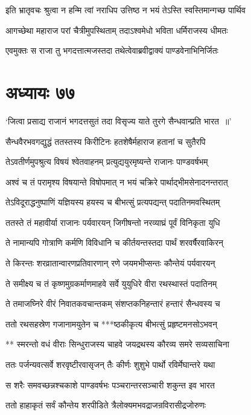 \twolineshloka
{इति भ्रातृवचः श्रुत्वा न हन्मि त्वां नराधिप}
{उत्तिष्ठ न भयं तेऽस्ति स्वस्तिमान्गच्छ पार्थिव}


\twolineshloka
{आगच्छेथा महाराज परां चैत्रीमुपस्थिताम्}
{तदाऽश्वमेधो भविता धर्मिराजस्य धीमतः}


\twolineshloka
{एवमुक्तः स राजा तु भगदत्तात्मजस्तदा}
{तथेत्वेवाब्रवीद्वाक्यं पाण्डवेनाभिनिर्जितः}


\chapter{अध्यायः ७७}
\twolineshloka
{`जित्वा प्रसाद्य राजानं भगदत्तसुतं तदा}
{विसृज्य याते तुरगे सैन्धवान्प्रति भारत ॥'}


\twolineshloka
{सैन्धवैरभवगद्युद्धं ततस्तस्य किरीटिनः}
{हतशेषैर्महाराज हतानां च सुतैरपि}


\twolineshloka
{तेऽवतीर्णमुपश्रुत्य विषयं श्वेतवाहनम्}
{प्रत्युद्ययुरमृष्यन्ते राजानः पाण्डवर्षभम्}


\twolineshloka
{अश्वं च तं परामृश्य विषयान्ते विषोपमात्}
{न भयं चक्रिरे पार्थाद्भीमसेनादनन्तरात्}


\twolineshloka
{तेऽविदूराद्धनुष्पाणिं यज्ञियस्य हयस्य च}
{बीभत्सुं प्रत्यपद्यन्त् पदातिनमवस्थितम्}


\twolineshloka
{ततस्ते तं महावीर्या राजानः पर्यवारयन्}
{जिगीषन्तो नरव्याघ्रं पूर्वं विनिकृता युधि}


\twolineshloka
{ते नामान्यपि गोत्राणि कर्मणि विविधानि च}
{कीर्तयन्तस्तदा पार्थं शरवर्षैरवाकिरन्}


\twolineshloka
{ते किरन्तः शरव्रातान्वारणप्रतिवारणान्}
{रणे जयमभीप्सन्तः कौन्तेयं पर्यवारयन्}


\twolineshloka
{ते समीक्ष्य च तं कृष्णमुग्रकर्माणमाहवे}
{सर्वे युयुधिरे वीरा रथस्थास्तं पदातिनम्}


\twolineshloka
{ते तमाजघ्निरे वीरं निवातकवचान्तकम्}
{संशप्तकनिहन्तारं हन्तारं सैन्धवस्य च}


\twolineshloka
{ततो रथसहस्रेण गजानामयुतेन च}
{***ष्ठकीकृत्य बीभत्सुं प्रहृष्टमनसोऽभवन्}


\twolineshloka
{** स्मरन्तो वधं वीराः सिन्धुराजस्य चाहवे}
{जयद्रथस्य कौरव्य समरे सव्यसाचिना}


\twolineshloka
{ततः पर्जन्यवत्सर्वे शरवृष्टीरवासृजन्}
{तैः कीर्णः शुशुभे पार्थो रविर्मेघान्तरे यथा}


\twolineshloka
{स शरैः समवच्छन्नश्चकाशे पाण्डवर्षभः}
{पञ्चरान्तरसञ्चारी शकुन्त इव भारत}


\twolineshloka
{ततो हाहाकृतं सर्वं कौन्तेय शरपीडिते}
{त्रैलोक्यमभवद्राजन्रविरासीद्रजोरुणः}



